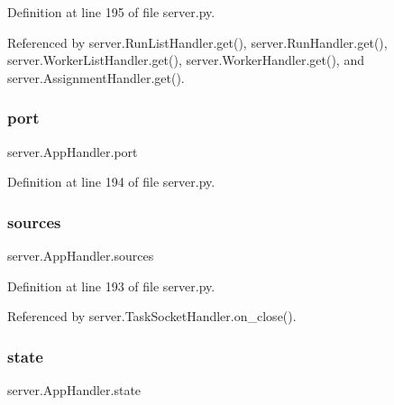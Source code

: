 Definition at line 195 of file server.\+py.



Referenced by server.\+Run\+List\+Handler.\+get(), server.\+Run\+Handler.\+get(), server.\+Worker\+List\+Handler.\+get(), server.\+Worker\+Handler.\+get(), and server.\+Assignment\+Handler.\+get().

\mbox{\label{classserver_1_1AppHandler_ae803a72362eafb0cbfae8711a42496e8}} 
\subsubsection{\texorpdfstring{port}{port}}
{\footnotesize\ttfamily server.\+App\+Handler.\+port}



Definition at line 194 of file server.\+py.

\mbox{\label{classserver_1_1AppHandler_a6bc198c0db14c674bb6350505fdd6285}} 
\subsubsection{\texorpdfstring{sources}{sources}}
{\footnotesize\ttfamily server.\+App\+Handler.\+sources}



Definition at line 193 of file server.\+py.



Referenced by server.\+Task\+Socket\+Handler.\+on\+\_\+close().

\mbox{\label{classserver_1_1AppHandler_a0d2ee6ab47de1189bc8d4f958e182119}} 
\subsubsection{\texorpdfstring{state}{state}}
{\footnotesize\ttfamily server.\+App\+Handler.\+state}



